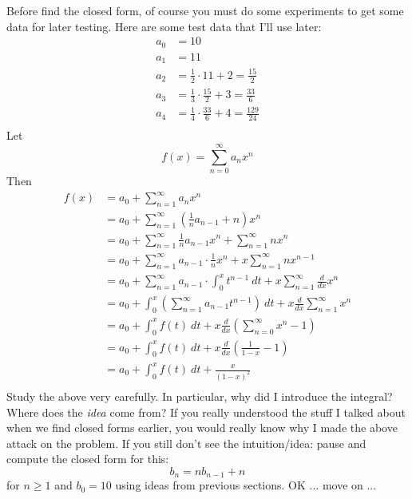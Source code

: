 Before find the closed form, of course you must do some experiments
to get some data for later testing.
Here are some test data that I'll use later:
\begin{align*}
a_0 &= 10 \\
a_1 &= 11 \\
a_2 &= \frac{1}{2} \cdot 11 + 2 = \frac{15}{2} \\
a_3 &= \frac{1}{3} \cdot \frac{15}{2} + 3 = \frac{33}{6} \\
a_4 &= \frac{1}{4} \cdot \frac{33}{6} + 4 = \frac{129}{24} \\
\end{align*}
Let
\[
f(x) = \sum_{n = 0}^\infty a_n x^n
\]
Then
\begin{align*}
f(x)
&= a_0 + \sum_{n = 1}^\infty a_n x^n \\
&= a_0 + \sum_{n = 1}^\infty \left( \frac{1}{n} a_{n-1} + n \right) x^n \\
&= a_0
  + \sum_{n = 1}^\infty \frac{1}{n} a_{n-1} x^n
  + \sum_{n = 1}^\infty  n x^n \\
&= a_0
  + \sum_{n = 1}^\infty a_{n-1} \cdot \frac{1}{n} x^{n}
  + x \sum_{n = 1}^\infty  n x^{n-1} \\
&= a_0
  + \sum_{n = 1}^\infty a_{n-1} \cdot \int_{0}^x t^{n-1} \ dt
  + x \sum_{n = 1}^\infty  \frac{d}{dx} x^n\\
&= a_0
  + \int_{0}^x \left( \sum_{n = 1}^\infty a_{n-1} t^{n-1} \right) \ dt
  + x \frac{d}{dx} \sum_{n = 1}^\infty  x^n\\
&= a_0
  + \int_0^x f(t) \ dt
  + x \frac{d}{dx} \left( \sum_{n = 0}^\infty  x^n - 1 \right) \\
&= a_0
  + \int_0^x f(t) \ dt
  + x \frac{d}{dx} \left( \frac{1}{1-x}  - 1 \right) \\
&= a_0
  + \int_0^x f(t) \ dt
  + \frac{x}{(1-x)^2}   \\
\end{align*}
Study the above very carefully.
In particular, why did I introduce the integral?
Where does the \textit{idea} come from?
If you really understood the stuff I talked about when we find closed
forms earlier, you would really know why I made the above attack on the
problem.
If you still don't see the intuition/idea:
pause and compute the closed form for this:
\[
b_n = nb_{n-1} + n
\]
for $n \geq 1$ and $b_0 = 10$ using ideas from previous sections.
OK ... move on ...

